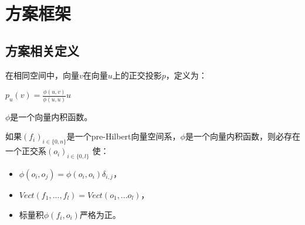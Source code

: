 
\section{方案框架}
\label{sec:searchpattern_scheme_framework}


\subsection{方案相关定义}
\label{sec:searchpattern_scheme_related_definition}




\begin{defn}[正交投影]
\label{defn:scale_function}

在相同空间中，向量$v$在向量$u$上的正交投影$p$，定义为：
\begin{center}
$p_u(v) = \frac{\phi(u,v)}{\phi(u,u)} u$
\end{center}
\end{defn}
$\phi$是一个向量内积函数。



\begin{thm}
\label{thm:gram_schmidt}
如果$(f_i)_{i\in\{0,n\}}$是一个pre-Hilbert向量空间系，$\phi$是一个向量内积函数，则必存在一个正交系$(o_i)_{i\in\{0, l\}}$ 使：
\begin{itemize}
  \item $\phi(o_i, o_j) = \phi(o_i, o_i)\delta_{i,j}$，
  \item $Vect(f_1,..., f_l) = Vect(o_1, ...o_l)$，
  \item 标量积$\phi(f_i,o_i)$严格为正。
\end{itemize}
\end{thm}




